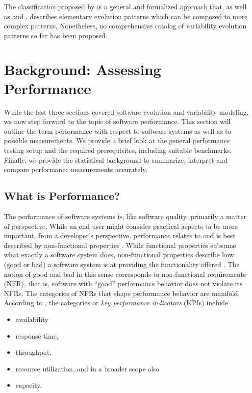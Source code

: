 The classification proposed by \cite{peng_analyzing_2011} is a general and formalized approach
that, as well as \cite{seidl_co-evolution_2012} and \cite{passos_towards_2012}, describes
elementary evolution patterns which can be composed to more complex patterns. Nonetheless, no
comprehensive catalog of variability evolution patterns so far has been
proposed.

\section{Background: Assessing Performance} \label{sec:assessing_performance}
While the last three sections covered software evolution and variability
modeling, we now step forward to the topic of software performance. This
section will outline the term performance with respect to software systems as
well as to possible measurements. We provide a brief look at the general performance
testing setup and the required prerequisites, including suitable benchmarks.
Finally, we provide the statistical background to summarize, interpret and
compare performance measurements accurately.

\subsection{What is Performance?}
The performance of software systems is, like software quality, primarily a
matter of perspective. While an end user might consider practical aspects to be
more important, from a developer’s perspective, performance relates to and is
best described by non-functional properties
\citep{liggesmeyer_software-qualitat:_2009,molyneaux_art_2014}.
While functional properties subsume what exactly a software system does, non-functional
properties describe how (good or bad) a software system is at providing the
functionality offered \citep{liggesmeyer_software-qualitat:_2009}. The notion
of good and bad in this sense corresponds to non-functional requirements (NFR),
that is, software with ``good'' performance behavior does not violate its NFRs.
The categories of NFRs that shape performance behavior are manifold. According to \cite{molyneaux_art_2014}, the categories or
\emph{key performance indicators} (KPIs) include 

\begin{itemize}
  \item availability
  \item response time,
  \item throughput,
  \item resource utilization, and in a broader scope also 
  \item capacity.
\end{itemize}

